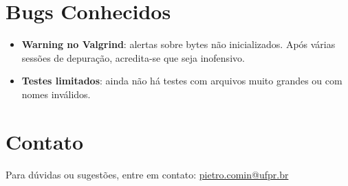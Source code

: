 \documentclass[12pt]{article}
\begin{document}
\section*{Bugs Conhecidos}

\begin{itemize}
    \item \textbf{Warning no Valgrind}: alertas sobre bytes não inicializados. Após várias sessões de depuração, acredita-se que seja inofensivo.
    \item \textbf{Testes limitados}: ainda não há testes com arquivos muito grandes ou com nomes inválidos.
\end{itemize}

\section*{Contato}

Para dúvidas ou sugestões, entre em contato: \href{mailto:pietro.comin@ufpr.br}{pietro.comin@ufpr.br}
\end{document}
